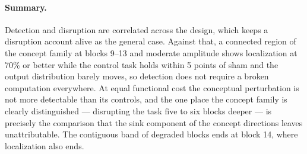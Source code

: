 \paragraph{Summary.}
Detection and disruption are correlated across the design, which keeps a disruption account alive as the general case.
Against that, a connected region of the concept family at blocks 9--13 and moderate amplitude shows localization at 70\% or better while the control task holds within 5 points of sham and the output distribution barely moves, so detection does not require a broken computation everywhere.
At equal functional cost the conceptual perturbation is not more detectable than its controls, and the one place the concept family is clearly distinguished --- disrupting the task five to six blocks deeper --- is precisely the comparison that the sink component of the concept directions leaves unattributable.
The contiguous band of degraded blocks ends at block 14, where localization also ends.
